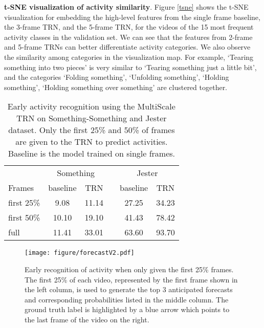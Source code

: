 \documentclass[runningheads]{llncs}
\begin{document}
\textbf{t-SNE visualization of activity similarity}. Figure \ref{tsne} shows the t-SNE visualization for embedding the high-level features from the single frame baseline, the 3-frame TRN, and the 5-frame TRN, for the videos of the 15 most frequent activity classes in the validation set. We can see that the features from 2-frame and 5-frame TRNs can better differentiate activity categories. We also observe the similarity among categories in the visualization map. For example, `Tearing something into two pieces' is very similar to `Tearing something just a little bit', and the categories `Folding something', `Unfolding something', `Holding something', `Holding something over something' are clustered together. 

\begin{table}
\vspace{-6mm}
\caption{Early activity recognition using the MultiScale TRN on Something-Something and Jester dataset. Only the first 25\% and 50\% of frames are given to the TRN to predict activities. Baseline is the model trained on single frames. }\label{forecasting}
\small
\centering
\begin{tabular}{ p{1.5cm}  c c p{0.3cm}  c  c}
\toprule 
& \multicolumn{2}{c}{Something} & & \multicolumn{2}{c}{Jester} \\
\cline{2-3} \cline{5-6}
Frames & baseline & TRN & & baseline & TRN \\
\hline   
first 25\% & 9.08 & 11.14 & & 27.25 & 34.23 \\
first 50\% & 10.10 & 19.10 & & 41.43 & 78.42 \\
full & 11.41 & 33.01 & & 63.60 & 93.70 \\
\bottomrule
\end{tabular}
\vspace{-4mm}
\end{table}

\begin{figure}
\centering
\texttt{[image: figure/forecastV2.pdf]}
\vspace{-3mm}
\caption{Early recognition of activity when only given the first 25\% frames. The first 25\% of each video, represented by the first frame shown in the left column, is used to generate the top 3 anticipated forecasts and corresponding probabilities listed in the middle column. The ground truth label is highlighted by a blue arrow which points to the last frame of the video on the right.}
\label{forecasting_qualitative}
\vspace{-4mm}
\end{figure}
\end{document}
